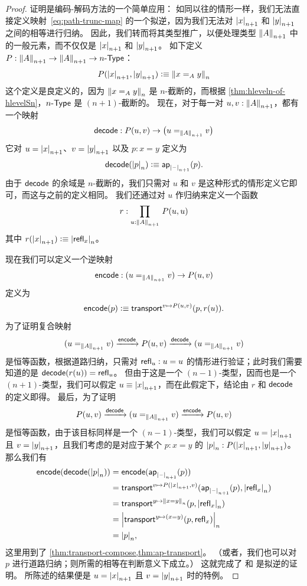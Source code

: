 \begin{proof}
  证明是编码-解码方法的一个简单应用：
  如同以往的情形一样，我们无法直接定义映射~\eqref{eq:path-trunc-map} 的一个拟逆，因为我们无法对 $\tproj {n+1}x$ 和 $\tproj {n+1}y$ 之间的相等进行归纳。
  因此，我们转而将其类型推广，以便处理类型 $\trunc{n+1}A$ 中的一般元素，而不仅仅是 $\tproj {n+1}x$ 和 $\tproj {n+1}y$。
  如下定义 $P:\trunc {n+1}A\to\trunc {n+1}A\to\typele{n}$：
  \[P(\tproj {n+1}x,\tproj {n+1}y)\defeq \trunc n{x=_Ay}\]
  这个定义是良定义的，因为 $\trunc n{x=_Ay}$ 是 $n$-截断的，而根据 \cref{thm:hleveln-of-hlevelSn}，$\typele{n}$ 是 $(n+1)$-截断的。
  现在，对于每一对 $u,v:\trunc{n+1}A$，都有一个映射
  \[\decode:P(u,v) \to \big(u=_{\trunc{n+1}A}v\big)\]
  它对 $u=\tproj {n+1}x$、$v=\tproj {n+1}y$ 以及 $p:x=y$ 定义为
  \[\decode(\tproj n{p})\defeq \apfunc{\tprojf{n+1}} (p).\]
  由于 $\decode$ 的余域是 $n$-截断的，我们只需对 $u$ 和 $v$ 是这种形式的情形定义它即可，而这与之前的定义相同。
  我们还通过对 $u$ 作归纳来定义一个函数
  \[ r : \prd{u:\trunc{n+1} A} P(u,u) \]
  其中 $r(\tproj{n+1} x) \defeq \tproj n {\refl x}$。

  现在我们可以定义一个逆映射
  \[\encode: (u=_{\trunc{n+1}A}v) \to P(u,v)\]
  定义为
  \[\encode(p) \defeq \transfib{v\mapsto P(u,v)}{p}{r(u)}. \]
  为了证明复合映射
  \[ (u=_{\trunc{n+1}A}v) \xrightarrow{\encode} P(u,v) \xrightarrow{\decode} (u=_{\trunc{n+1}A}v) \]
  是恒等函数，根据道路归纳，只需对 $\refl u : u=u$ 的情形进行验证；此时我们需要知道的是 $\decode(r(u)) = \refl{u}$。
  但由于这是一个 $(n-1)$-类型，因而也是一个 $(n+1)$-类型，我们可以假定 $u\jdeq \tproj {n+1} x$，而在此假定下，结论由 $r$ 和 $\decode$ 的定义即得。
  最后，为了证明
  \[ P(u,v) \xrightarrow{\decode} (u=_{\trunc{n+1}A}v) \xrightarrow{\encode} P(u,v) \]
  是恒等函数，由于该目标同样是一个 $(n-1)$-类型，我们可以假定 $u=\tproj {n+1}x$ 且 $v=\tproj {n+1}y$，且我们考虑的是对应于某个 $p:x=y$ 的 $\tproj n p:P(\tproj{n+1}x,\tproj{n+1}y)$。
  那么我们有
  \begin{align*}
    \encode(\decode(\tproj n p)) &= \encode(\apfunc{\tprojf{n+1}}(p))\\
    &= \transfib{v\mapsto P(\tproj{n+1}x,v)}{\apfunc{\tprojf{n+1}}(p)}{\tproj n {\refl x}}\\
    &= \transfib{y\mapsto \trunc n{x=y}}{p}{\tproj n {\refl x}}\\
    &= \tproj n {\transfib{y \mapsto (x=y)}{p}{\refl x}}\\
    &= \tproj n p,
  \end{align*}
  这里用到了 \cref{thm:transport-compose,thm:ap-transport}。
  （或者，我们也可以对 $p$ 进行道路归纳；则所需的相等在判断意义下成立。）
  这就完成了 \decode 和 \encode 是拟逆的证明。
  所陈述的结果便是 $u=\tproj {n+1}x$ 且 $v=\tproj {n+1}y$ 时的特例。
\end{proof}


